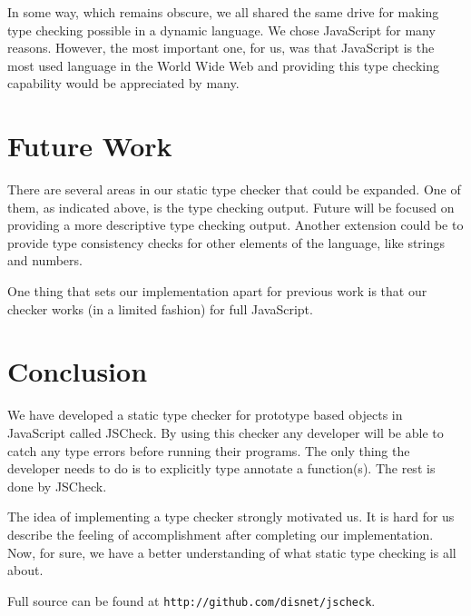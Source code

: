 \documentclass{article}
\begin{document}
In some way, which remains obscure, we all shared the same drive for making type 
checking possible in a dynamic language. We chose JavaScript for many reasons. 
However, the most important one, for us, was that JavaScript is the most used 
language in the World Wide Web and providing this type checking capability would
be appreciated by many. 

\section{Future Work}
There are several areas in our static type checker that could be expanded. One of
them, as indicated above, is the type checking output. Future will be focused on 
providing a more descriptive type checking output. Another extension could be to
provide type consistency checks for other elements of the language, like strings
and numbers.


One thing that sets our 
implementation apart for previous work is that our checker works (in a limited fashion) for
full JavaScript.

\section{Conclusion}
\label{sec:conclusion}
We have developed a static type checker for prototype based objects in JavaScript
called JSCheck. By using this checker any developer will be able to catch any 
type errors before running their programs. The only thing the developer needs to
do is to explicitly type annotate a function(s). The rest is done by JSCheck. 

The idea of implementing a type checker strongly motivated us. It is hard for us 
describe the feeling of accomplishment after completing our implementation. Now,
for sure, we have a better understanding of what static type checking is all about. 

Full source can be found at {\tt http://github.com/disnet/jscheck}.



\end{document}
